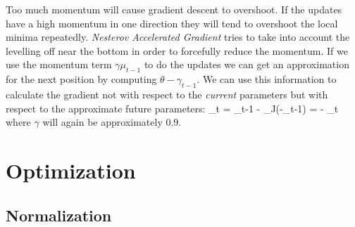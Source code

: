 Too much momentum will cause gradient descent to overshoot.
If the updates have a high momentum in one direction they will tend to overshoot the local minima repeatedly.
\textit{Nesterov Accelerated Gradient} tries to take into account the levelling off near the bottom in order to forcefully reduce the momentum.
If we use the momentum term $\gamma \mu_{t-1}$ to do the updates we can get an approximation for the next position by computing $\theta - \gamma_{t-1}$.
We can use this information to calculate the gradient not with respect to the \textit{current} parameters but with respect to the approximate future parameters:
\be
\mu_t = \gamma \mu_{t-1} - \eta \dot \Delta_\theta J(\theta-\gamma \mu_{t-1})
\ee
\be
\theta = \theta - \mu_t
\ee
where $\gamma$ will again be approximately 0.9.
%
%
%
%
%
%
%
%
%
%
%

\section{Optimization}
	\subsection{Normalization}

